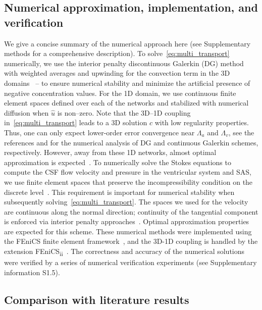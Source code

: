 \documentclass[fleqn,10pt]{wlscirep}
\begin{document}
\subsection*{Numerical approximation, implementation, and verification}

We give a concise summary of the numerical approach here (see
Supplementary methods for a comprehensive description). To
solve~\eqref{eq:multi_transport} numerically, we use the interior
penalty discontinuous Galerkin (DG) method with weighted averages and
upwinding for the convection term in the 3D
domains~\cite{ern2009discontinuous} -- to ensure numerical stability
and minimize the artificial presence of negative concentration
values. For the 1D domain, we use continuous finite element spaces
defined over each of the networks and stabilized with numerical
diffusion when $\hat{u}$ is non--zero. Note that the 3D--1D coupling
in~\eqref{eq:multi_transport} leads to a 3D solution $c$ with low
regularity properties. Thus, one can only expect lower-order error
convergence near $\Lambda_a$ and $\Lambda_v$, see the references
\cite{masri2024discontinuous} and \cite{laurino2019derivation} for the
numerical analysis of DG and continuous Galerkin schemes,
respectively. However, away from these 1D networks, almost optimal
approximation is
expected~\cite{masri2023discontinuous,koppl2016local}. To numerically
solve the Stokes equations to compute the CSF flow velocity and
pressure in the ventricular system and SAS, we use finite element
spaces that preserve the incompressibility condition on the discrete
level~\cite{hong2016robust}. This requirement is important for
numerical stability when subsequently
solving~\eqref{eq:multi_transport}\cite{cesmelioglu2022compatible}.
The spaces we used for the velocity are continuous along the normal
direction; continuity of the tangential component is enforced via
interior penalty approaches~\cite{hong2016robust}. Optimal
approximation properties are expected for this scheme. These numerical
methods were implemented using the FEniCS finite element
framework~\cite{alnaes2015fenics}, and the 3D-1D coupling is handled
by the extension
FEniCS\textsubscript{ii}~\cite{kuchta2020assembly}. The correctness
and accuracy of the numerical solutions were verified by a series of
numerical verification experiments (see Supplementary information S1.5).

\subsection*{Comparison with literature results}
\end{document}
